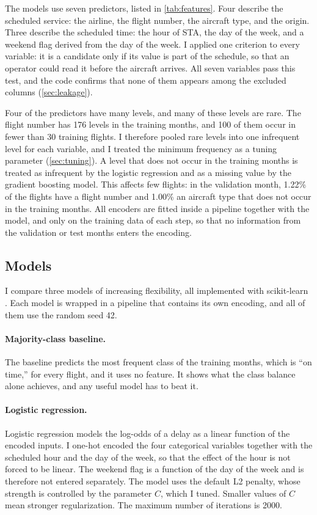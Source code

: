 The models use seven predictors, listed in \cref{tab:features}. Four describe the scheduled service: the airline, the flight number, the aircraft type, and the origin. Three describe the scheduled time: the hour of STA, the day of the week, and a weekend flag derived from the day of the week. I applied one criterion to every variable: it is a candidate only if its value is part of the schedule, so that an operator could read it before the aircraft arrives. All seven variables pass this test, and the code confirms that none of them appears among the excluded columns (\cref{sec:leakage}).



Four of the predictors have many levels, and many of these levels are rare. The flight number has 176 levels in the training months, and 100 of them occur in fewer than 30 training flights. I therefore pooled rare levels into one infrequent level for each variable, and I treated the minimum frequency as a tuning parameter (\cref{sec:tuning}). A level that does not occur in the training months is treated as infrequent by the logistic regression and as a missing value by the gradient boosting model. This affects few flights: in the validation month, 1.22\% of the flights have a flight number and 1.00\% an aircraft type that does not occur in the training months. All encoders are fitted inside a pipeline together with the model, and only on the training data of each step, so that no information from the validation or test months enters the encoding.

\subsection{Models}\label{sec:models}

I compare three models of increasing flexibility, all implemented with scikit-learn \citep{pedregosa2011scikit}. Each model is wrapped in a pipeline that contains its own encoding, and all of them use the random seed 42.

\paragraph{Majority-class baseline.} The baseline predicts the most frequent class of the training months, which is ``on time,'' for every flight, and it uses no feature. It shows what the class balance alone achieves, and any useful model has to beat it.

\paragraph{Logistic regression.} Logistic regression models the log-odds of a delay as a linear function of the encoded inputs. I one-hot encoded the four categorical variables together with the scheduled hour and the day of the week, so that the effect of the hour is not forced to be linear. The weekend flag is a function of the day of the week and is therefore not entered separately. The model uses the default L2 penalty, whose strength is controlled by the parameter $C$, which I tuned. Smaller values of $C$ mean stronger regularization. The maximum number of iterations is 2000.

